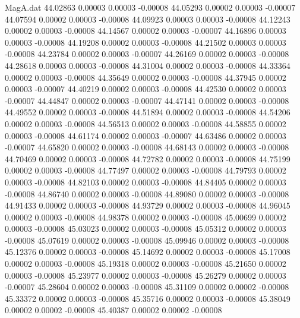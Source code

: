 \begin{filecontents}{MagA.dat}
  44.02863    0.00003    0.00003   -0.00008
  44.05293    0.00002    0.00003   -0.00007
  44.07594    0.00002    0.00003   -0.00008
  44.09923    0.00003    0.00003   -0.00008
  44.12243    0.00002    0.00003   -0.00008
  44.14567    0.00002    0.00003   -0.00007
  44.16896    0.00003    0.00003   -0.00008
  44.19208    0.00002    0.00003   -0.00008
  44.21502    0.00003    0.00003   -0.00008
  44.23784    0.00002    0.00003   -0.00007
  44.26169    0.00002    0.00003   -0.00008
  44.28618    0.00003    0.00003   -0.00008
  44.31004    0.00002    0.00003   -0.00008
  44.33364    0.00002    0.00003   -0.00008
  44.35649    0.00002    0.00003   -0.00008
  44.37945    0.00002    0.00003   -0.00007
  44.40219    0.00002    0.00003   -0.00008
  44.42530    0.00002    0.00003   -0.00007
  44.44847    0.00002    0.00003   -0.00007
  44.47141    0.00002    0.00003   -0.00008
  44.49552    0.00002    0.00003   -0.00008
  44.51894    0.00002    0.00003   -0.00008
  44.54206    0.00002    0.00003   -0.00008
  44.56513    0.00002    0.00003   -0.00008
  44.58855    0.00002    0.00003   -0.00008
  44.61174    0.00002    0.00003   -0.00007
  44.63486    0.00002    0.00003   -0.00007
  44.65820    0.00002    0.00003   -0.00008
  44.68143    0.00002    0.00003   -0.00008
  44.70469    0.00002    0.00003   -0.00008
  44.72782    0.00002    0.00003   -0.00008
  44.75199    0.00002    0.00003   -0.00008
  44.77497    0.00002    0.00003   -0.00008
  44.79793    0.00002    0.00003   -0.00008
  44.82103    0.00002    0.00003   -0.00008
  44.84405    0.00002    0.00003   -0.00008
  44.86740    0.00002    0.00003   -0.00008
  44.89080    0.00002    0.00003   -0.00008
  44.91433    0.00002    0.00003   -0.00008
  44.93729    0.00002    0.00003   -0.00008
  44.96045    0.00002    0.00003   -0.00008
  44.98378    0.00002    0.00003   -0.00008
  45.00699    0.00002    0.00003   -0.00008
  45.03023    0.00002    0.00003   -0.00008
  45.05312    0.00002    0.00003   -0.00008
  45.07619    0.00002    0.00003   -0.00008
  45.09946    0.00002    0.00003   -0.00008
  45.12376    0.00002    0.00003   -0.00008
  45.14692    0.00002    0.00003   -0.00008
  45.17008    0.00002    0.00003   -0.00008
  45.19318    0.00002    0.00003   -0.00008
  45.21650    0.00002    0.00003   -0.00008
  45.23977    0.00002    0.00003   -0.00008
  45.26279    0.00002    0.00003   -0.00007
  45.28604    0.00002    0.00003   -0.00008
  45.31109    0.00002    0.00002   -0.00008
  45.33372    0.00002    0.00003   -0.00008
  45.35716    0.00002    0.00003   -0.00008
  45.38049    0.00002    0.00002   -0.00008
  45.40387    0.00002    0.00002   -0.00008

\end{filecontents}
